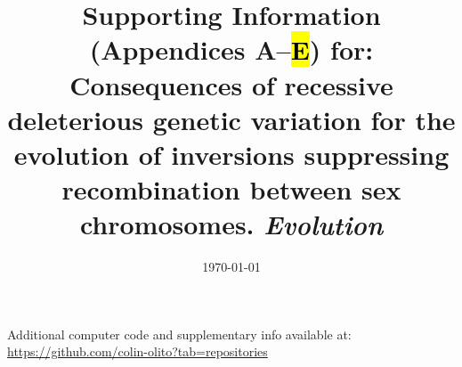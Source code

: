 \documentclass{article}
\title{Supporting Information (Appendices A--\hl{E}) for: Consequences of recessive deleterious genetic variation for the evolution of inversions suppressing recombination between sex chromosomes. \textit{Evolution}}
\date{\today}
\newcommand\hl[1]{%
  \bgroup
  \hskip0pt\color{blue!80!black}%
  #1%
  \egroup
}
\begin{document}
\maketitle



\bigskip

\noindent{} Additional computer code and supplementary info available at: \url{https://github.com/colin-olito?tab=repositories}

\bigskip

\newpage

\tableofcontents

\newpage
\end{document}
